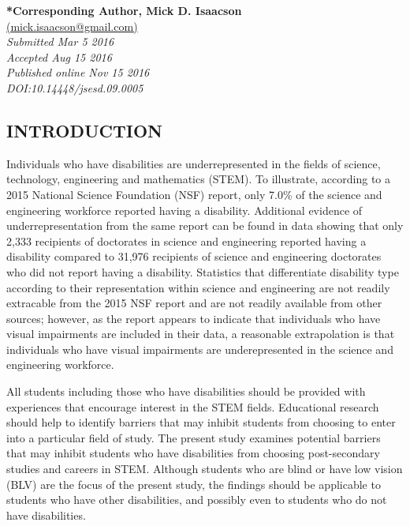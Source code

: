 \documentclass[11.5pt]{sig-alternate} %
\begin{document}

\textbf{*Corresponding Author, Mick D. Isaacson}\\
\href{mailto: mick.isaacson@gmail.com }{(mick.isaacson@gmail.com)} \\
\textit{Submitted  Mar 5 2016 }\\
\textit{Accepted Aug 15 2016} \\
\textit{Published online  Nov 15 2016 } \\
\textit{DOI:10.14448/jsesd.09.0005} \\
\pagebreak
\clearpage
\begin{large}

\section*{INTRODUCTION}

Individuals who have disabilities are underrepresented in the fields of science, technology, engineering and mathematics (STEM). To illustrate, according to a 2015 National Science Foundation (NSF) report, only 7.0\% of the science and engineering workforce reported having a disability. Additional evidence of underrepresentation from the same report can be found in data showing that only 2,333 recipients of doctorates in science and engineering reported having a disability compared to 31,976 recipients of science and engineering doctorates who did not report having a disability. Statistics that differentiate disability type according to their representation within science and engineering are not readily extracable from the 2015 NSF report and are not readily available from other sources; however, as the report appears to indicate that individuals who have visual impairments are included in their data, a reasonable extrapolation is that individuals who have visual impairments are underepresented in the science and engineering workforce.

All students including those who have disabilities should be provided with experiences that encourage interest in the STEM fields. Educational research should help to identify barriers that may inhibit students from choosing to enter into a particular field of study. The present study examines potential barriers that may inhibit students who have disabilities from choosing post-secondary studies and careers in STEM. Although students who are blind or have low vision (BLV) are the focus of the present study, the findings should be applicable to students who have other disabilities, and possibly even to students who do not have disabilities. 


\end{large}
\end{document}
